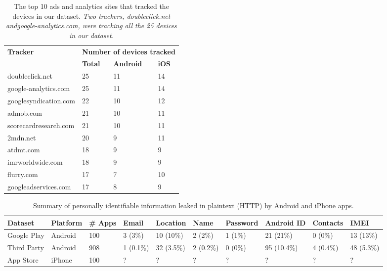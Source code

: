 \begin{table}[t]
\centering
\begin{small}
\begin{tabular}{|p{}|p{}|p{}|p{}|}
\hline
\multirow{2}{*}{\bf Tracker} & \multicolumn{3}{c|}{\bf Number of devices tracked}\tabularnewline
\cline{2-4}
   &  {\bf Total} & {\bf Android} & {\bf iOS} \tabularnewline
\hline
doubleclick.net & 25 & 11 & 14 \tabularnewline
\hline
google-analytics.com   & 25 & 11 & 14 \tabularnewline
\hline
googlesyndication.com  & 22 & 10 & 12 \tabularnewline
\hline
admob.com  & 21 & 10 & 11 \tabularnewline
\hline
scorecardresearch.com &  21 & 10 & 11 \tabularnewline
\hline
2mdn.net  &  20 & 9 &  11 \tabularnewline
\hline
atdmt.com  & 18 & 9 &  9 \tabularnewline
\hline
imrworldwide.com & 18 &  9 &  9 \tabularnewline
\hline
flurry.com & 17 & 7 &  10 \tabularnewline
\hline
googleadservices.com  & 17 & 8 &  9 \tabularnewline
\hline
\end{tabular}
\end{small}
\caption{The top 10 ads and analytics sites that tracked the devices in our dataset.
\emph{Two trackers, \emph{doubleclick.net} and\emph{google-analytics.com}, were tracking all the 25 devices in our dataset.}}
\label{tab:top_trackers}
\end{table}


\begin{table}[t]
    \centering
    \begin{tabular}{l|l|l|l|l|l|l|l|l|l}
       Dataset&Platform&\# Apps&Email&Location&Name&Password&Android ID&Contacts&IMEI\\
       \hline
       \hline
       Google Play&Android&100&3 (3\%)&10 (10\%)&2 (2\%)&1 (1\%)&21 (21\%)&0 (0\%)&13 (13\%)\\
       \hline
       Third Party&Android&908&1 (0.1\%)&32 (3.5\%)&2 (0.2\%)&0 (0\%)&95 (10.4\%)&4 (0.4\%)&48 (5.3\%)\\
       \hline
       App Store&iPhone&100&?&?&?&?&?&?&?\\
    \end{tabular}
    \caption{\label{tbl:pii}Summary of personally identifiable information leaked in plaintext (HTTP) by Android and iPhone apps.}
  \end{table}
  

